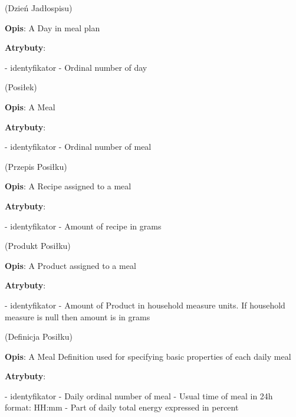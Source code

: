 \begin{enumerate}[label={\textbf{KAT/\protect\threedigits{\theenumi}}}, wide, labelwidth=!, labelindent=0pt, labelsep=0pt, series=reqs]
     \label{kat:MealPlanDay} (Dzień Jadłospisu)

    \textbf{Opis}: A Day in meal plan
    \par
    \textbf{Atrybuty}:
    \begin{itemize}[series=atr, wide, align=left, leftmargin=190pt]
         \label{kat:MealPlanDay:id} - identyfikator
         \label{kat:MealPlanDay:ordinalNumber} - Ordinal number of day
    \end{itemize}

     \label{kat:Meal} (Posiłek)

    \textbf{Opis}: A Meal
    \par
    \textbf{Atrybuty}:
    \begin{itemize}[series=atr, wide, align=left, leftmargin=190pt]
         \label{kat:Meal:id} - identyfikator
         \label{kat:Meal:ordinalNumber} - Ordinal number of meal
    \end{itemize}

     \label{kat:MealRecipe} (Przepis Posiłku)

    \textbf{Opis}: A Recipe assigned to a meal
    \par
    \textbf{Atrybuty}:
    \begin{itemize}[series=atr, wide, align=left, leftmargin=190pt]
         \label{kat:MealRecipe:id} - identyfikator
         \label{kat:MealRecipe:amount} - Amount of recipe in grams
    \end{itemize}

     \label{kat:MealProduct} (Produkt Posiłku)

    \textbf{Opis}: A Product assigned to a meal
    \par
    \textbf{Atrybuty}:
    \begin{itemize}[series=atr, wide, align=left, leftmargin=190pt]
         \label{kat:MealProduct:id} - identyfikator
         \label{kat:MealProduct:amount} - Amount of Product in household measure units. If household measure is null then amount is in grams
    \end{itemize}

     \label{kat:MealDefinition} (Definicja Posiłku)

    \textbf{Opis}: A Meal Definition used for specifying basic properties of each daily meal
    \par
    \textbf{Atrybuty}:
    \begin{itemize}[series=atr, wide, align=left, leftmargin=190pt]
         \label{kat:MealDefinition:id} - identyfikator
         \label{kat:MealDefinition:ordinalNumber} - Daily ordinal number of meal
         \label{kat:MealDefinition:timeOfMeal} - Usual time of meal in 24h format: HH:mm
         \label{kat:MealDefinition:percentOfEnergy} - Part of daily total energy expressed in percent
    \end{itemize}


\end{enumerate}
